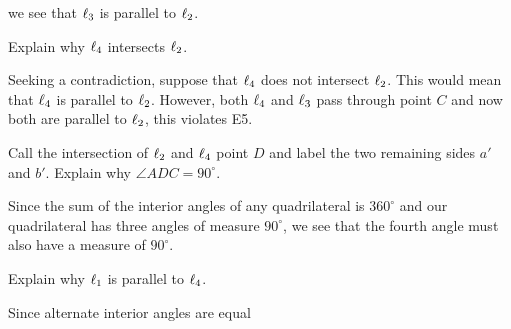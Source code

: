 \documentclass[newpage,hints,handout]{ximera}
\begin{document}
\begin{problem}
\begin{freeResponse}
\begin{image}
\end{image}
we see that $\ell_3$ is parallel to $\ell_2$. 
\end{freeResponse}


Explain why $\ell_4$ intersects $\ell_2$.

\begin{freeResponse}
  Seeking a contradiction, suppose that $\ell_4$ does not intersect
  $\ell_2$. This would mean that $\ell_4$ is parallel to $\ell_2$. However,
  both $\ell_4$ and $\ell_3$ pass through point $C$ and now both are
  parallel to $\ell_2$, this violates E5.
\end{freeResponse}


Call the intersection of $\ell_2$ and $\ell_4$ point $D$ and label the two
remaining sides $a'$ and $b'$. Explain why $\angle ADC = 90^\circ$.

\begin{freeResponse}
Since the sum of the interior angles of any quadrilateral is
$360^\circ$ and our quadrilateral has three angles of measure
$90^\circ$, we see that the fourth angle must also have a measure of
$90^\circ$.
\end{freeResponse}



Explain why $\ell_1$ is parallel to $\ell_4$.

\begin{freeResponse}
Since alternate interior angles are equal
\begin{image}
\end{image}
\end{freeResponse}
\end{problem}
\end{document}
